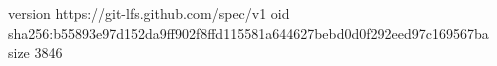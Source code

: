 version https://git-lfs.github.com/spec/v1
oid sha256:b55893e97d152da9ff902f8ffd115581a644627bebd0d0f292eed97c169567ba
size 3846
